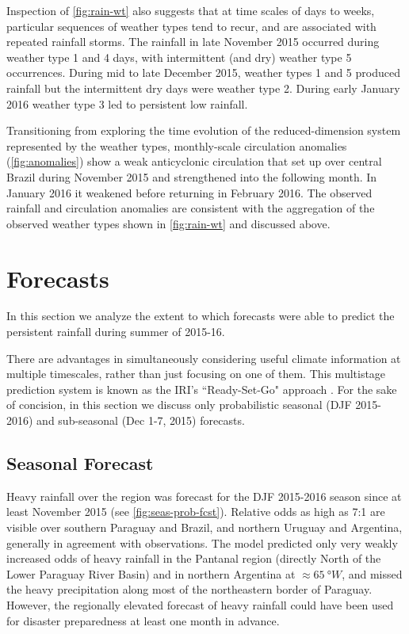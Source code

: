 \documentclass[twocol]{ametsoc}
\begin{document}
Inspection of \cref{fig:rain-wt} also suggests that at time scales of days to weeks, particular sequences of weather types tend to recur, and are associated with repeated rainfall storms.
The rainfall in late November 2015 occurred during weather type 1 and 4 days, with intermittent (and dry) weather type 5 occurrences.
During mid to late December 2015, weather types 1 and 5 produced rainfall but the intermittent dry days were weather type 2.
During early January 2016 weather type 3 led to persistent low rainfall.

Transitioning from exploring the time evolution of the reduced-dimension system represented by the weather types, monthly-scale circulation anomalies (\cref{fig:anomalies}) show a weak anticyclonic circulation that set up over central Brazil during November 2015 and strengthened into the following month.
In January 2016 it weakened before returning in February 2016.
The observed rainfall and circulation anomalies are consistent with the aggregation of the observed weather types shown in \cref{fig:rain-wt} and discussed above.


\section{Forecasts} \label{sec:fcsts}

In this section we analyze the extent to which forecasts were able to predict the persistent rainfall during summer of 2015-16.

There are advantages in simultaneously considering useful climate information at multiple timescales, rather than just focusing on one of them.
This multistage prediction system is known as the IRI's ``Ready-Set-Go" approach \citep{Hellmuth:2011vt,Goddard:2014kf}.
For the sake of concision, in this section we discuss only probabilistic seasonal (DJF 2015-2016) and sub-seasonal (Dec 1-7, 2015) forecasts.

\subsection{Seasonal Forecast}

Heavy rainfall over the region was forecast for the DJF 2015-2016 season since at least November 2015 (see \cref{fig:seas-prob-fcst}).
Relative odds as high as 7:1 are visible over southern Paraguay and Brazil, and northern Uruguay and Argentina, generally in agreement with observations.
The model predicted only very weakly increased odds of heavy rainfall in the Pantanal region (directly North of the Lower Paraguay River Basin) and in northern Argentina at $\approx \SI{65}{\degree W}$, and missed the heavy precipitation along most of the northeastern border of Paraguay.
However, the regionally elevated forecast of heavy rainfall could have been used for disaster preparedness at least one month in advance.
\end{document}

